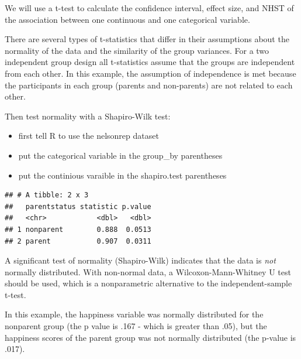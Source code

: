 \documentclass[
]{book}
\newenvironment{Shaded}{\begin{snugshade}}{\end{snugshade}}
\newcommand{\DataTypeTok}[1]{\textcolor[rgb]{0.13,0.29,0.53}{#1}}
\newcommand{\KeywordTok}[1]{\textcolor[rgb]{0.13,0.29,0.53}{\textbf{#1}}}
\newcommand{\NormalTok}[1]{#1}
\newcommand{\OperatorTok}[1]{\textcolor[rgb]{0.81,0.36,0.00}{\textbf{#1}}}
\newcommand{\StringTok}[1]{\textcolor[rgb]{0.31,0.60,0.02}{#1}}
\providecommand{\tightlist}{%
  \setlength{\itemsep}{0pt}\setlength{\parskip}{0pt}}
\begin{document}
We will use a t-test to calculate the confidence interval, effect size, and NHST of the association between one continuous and one categorical variable.

There are several types of t-statistics that differ in their assumptions about the normality of the data and the similarity of the group variances. For a two independent group design all t-statistics assume that the groups are independent from each other. In this example, the assumption of independence is met because the participants in each group (parents and non-parents) are not related to each other.

Then test normality with a Shapiro-Wilk test:

\begin{itemize}
\tightlist
\item
  first tell R to use the nelsonrep dataset\\
\item
  put the categorical variable in the group\_by parentheses\\
\item
  put the continious varaible in the shapiro.test parentheses
\end{itemize}

\begin{Shaded}
\end{Shaded}

\begin{verbatim}
## # A tibble: 2 x 3
##   parentstatus statistic p.value
##   <chr>            <dbl>   <dbl>
## 1 nonparent        0.888  0.0513
## 2 parent           0.907  0.0311
\end{verbatim}

A significant test of normality (Shapiro-Wilk) indicates that the data is \emph{not} normally distributed. With non-normal data, a Wilcoxon-Mann-Whitney U test should be used, which is a nonparametric alternative to the independent-sample t-test.

In this example, the happiness variable was normally distributed for the nonparent group (the p value is .167 - which is greater than .05), but the happiness scores of the parent group was not normally distributed (the p-value is .017).
\end{document}
